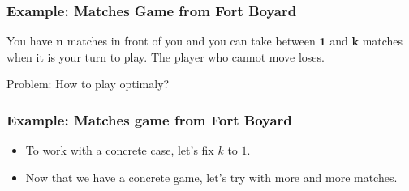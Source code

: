 \documentclass{beamer}
\begin{document}
\begin{frame}%
\frametitle{Example: Matches Game from Fort Boyard}

You have $\textbf{n}$ matches in front of you and you can take between $\textbf{1}$ and $\textbf{k}$ matches when it is your turn to play. The player
who cannot move loses.
\begin{mdframed}[style=exampledefault]
Problem: How to play optimaly?
\end{mdframed}


\end{frame}

\begin{frame}%
\frametitle{Example: Matches game from Fort Boyard}

\begin{itemize}

\item To work with a concrete case, let's fix $k$ to $1$.

\vspace{0.5cm}

\item<2-> Now that we have a concrete game, let's try with more and more matches.

\end{itemize}

\end{frame}
\end{document}
